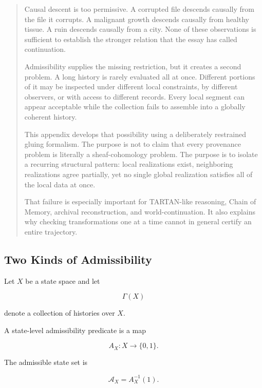 \documentclass[
  11pt,
  a4paper,
  DIV=12,
  BCOR=0mm,
  parskip=half-
]{scrartcl}
\theoremstyle{definition}
\theoremstyle{plain}
\theoremstyle{remark}
\newenvironment{orientation}
  {%
    \begin{quote}
    \small
    \setlength{\parindent}{1em}
  }
  {%
    \end{quote}
  }
\begin{document}
\begin{orientation}
Causal descent is too permissive. A corrupted file descends causally from the
file it corrupts. A malignant growth descends causally from healthy tissue. A
ruin descends causally from a city. None of these observations is sufficient
to establish the stronger relation that the essay has called continuation.

Admissibility supplies the missing restriction, but it creates a second
problem. A long history is rarely evaluated all at once. Different portions
of it may be inspected under different local constraints, by different
observers, or with access to different records. Every local segment can appear
acceptable while the collection fails to assemble into a globally coherent
history.

This appendix develops that possibility using a deliberately restrained
gluing formalism. The purpose is not to claim that every provenance problem is
literally a sheaf-cohomology problem. The purpose is to isolate a recurring
structural pattern: local realizations exist, neighboring realizations agree
partially, yet no single global realization satisfies all of the local data at
once.

That failure is especially important for TARTAN-like reasoning, Chain of
Memory, archival reconstruction, and world-continuation. It also explains why
checking transformations one at a time cannot in general certify an entire
trajectory.
\end{orientation}


\subsection{Two Kinds of Admissibility}
\label{app:two-admissibilities}

Let \(X\) be a state space and let

\[
  \Gamma(X)
\]

denote a collection of histories over \(X\).

A state-level admissibility predicate is a map

\[
  A_X:X\to\{0,1\}.
\]

The admissible state set is

\[
  \mathcal A_X
  =
  A_X^{-1}(1).
\]
\end{document}
